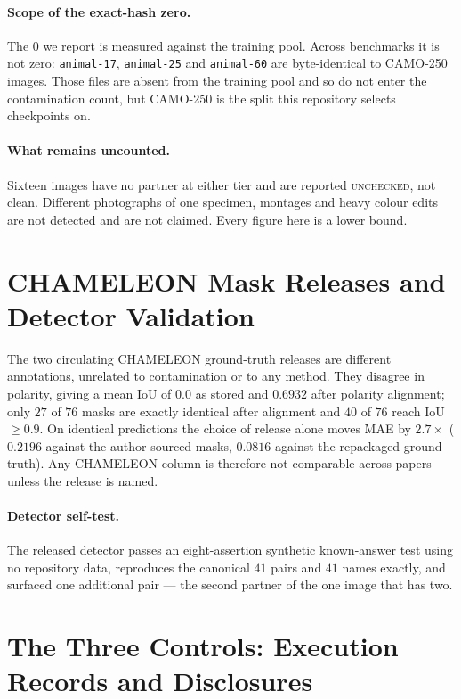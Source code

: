 \documentclass{article}
\begin{document}
\paragraph{Scope of the exact-hash zero.} The $0$ we report is measured against the training pool.
Across benchmarks it is not zero: \texttt{animal-17}, \texttt{animal-25} and \texttt{animal-60} are
byte-identical to CAMO-250 images. Those files are absent from the training pool and so do not enter
the contamination count, but CAMO-250 is the split this repository selects checkpoints on.

\paragraph{What remains uncounted.} Sixteen images have no partner at either tier and are reported
\textsc{unchecked}, not clean. Different photographs of one specimen, montages and heavy colour edits
are not detected and are not claimed. Every figure here is a lower bound.


\section{CHAMELEON Mask Releases and Detector Validation}
\label{app:masks}

The two circulating CHAMELEON ground-truth releases are different annotations, unrelated to
contamination or to any method. They disagree in polarity, giving a mean IoU of $0.0$ as stored and
$0.6932$ after polarity alignment; only $27$ of $76$ masks are exactly identical after alignment and
$40$ of $76$ reach IoU $\geq 0.9$. On identical predictions the choice of release alone moves MAE by
$2.7\times$ ($0.2196$ against the author-sourced masks, $0.0816$ against the repackaged ground truth).
Any CHAMELEON column is therefore not comparable across papers unless the release is named.

\paragraph{Detector self-test.} The released detector passes an eight-assertion synthetic
known-answer test using no repository data, reproduces the canonical $41$ pairs and $41$ names
exactly, and surfaced one additional pair --- the second partner of the one image that has two.

\section{The Three Controls: Execution Records and Disclosures}
\label{app:controls}
\end{document}
